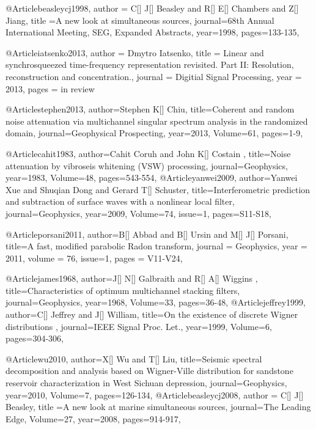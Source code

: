 {@Article{beasleycj1998,
  author = {C[] J[] Beasley and R[] E[] Chambers and Z[] Jiang},
  title ={A new look at simultaneous sources},
  journal={68th Annual International Meeting, SEG, Expanded Abstracts},
  year=1998,
  pages={133-135},
}

@Article{iatsenko2013,
  author = 	 {Dmytro Iatsenko},
  title = 	 {Linear and synchrosqueezed time-frequency representation revisited. Part II: Resolution, reconstruction and concentration.},
  journal = 	 {Digitial Signal Processing},
  year = 	 2013,
  pages =	 {in review}
}


@Article{stephen2013,
  author={Stephen K[] Chiu},
  title={Coherent and random noise attenuation via multichannel singular spectrum analysis in the randomized domain},
  journal={Geophysical Prospecting},
  year=2013,
  Volume=61,
  pages={1-9},
}


@Article{cahit1983,
  author={Cahit Coruh and John K[] Costain },
  title={Noise attenuation by vibroseis whitening (VSW) processing},
  journal={Geophysics},
  year=1983,
  Volume=48,
  pages={543-554},
}
@Article{yanwei2009,
  author={Yanwei Xue and Shuqian Dong and Gerard T[] Schuster},
  title={Interferometric prediction and subtraction of surface waves with a nonlinear local filter},
  journal={Geophysics},
  year=2009,
  Volume=74,
  issue=1,
  pages={S11-S18},
}





@Article{porsani2011,
  author={B[] Abbad and B[] Ursin and M[] J[] Porsani},
  title={A fast, modified parabolic Radon transform},
  journal = 	 {Geophysics},
  year = 	 2011,
  volume =	 76,
  issue=1,
  pages =	 {V11-V24},
}



@Article{james1968,
  author={J[] N[] Galbraith and R[] A[] Wiggins },
  title={Characteristics of optimum multichannel stacking filters},
  journal={Geophysics},
  year=1968,
  Volume=33,
  pages={36-48},
}
@Article{jeffrey1999,
  author={C[] Jeffrey and J[] William},
  title={On the existence of discrete Wigner distributions
},
  journal={IEEE Signal Proc. Let.},
  year=1999,
  Volume=6,
  pages={304-306},
}

@Article{wu2010,
  author={X[] Wu and T[] Liu},
  title={Seismic spectral decomposition and analysis based on Wigner-Ville distribution for sandstone reservoir characterization in West Sichuan depression},
  journal={Geophysics},
  year=2010,
  Volume=7,
  pages={126-134},
}
@Article{beasleycj2008,
  author = {C[] J[] Beasley},
  title ={A new look at marine simultaneous sources},
  journal={The Leading Edge},
  Volume=27,
  year=2008,
  pages={914-917},
}

}
